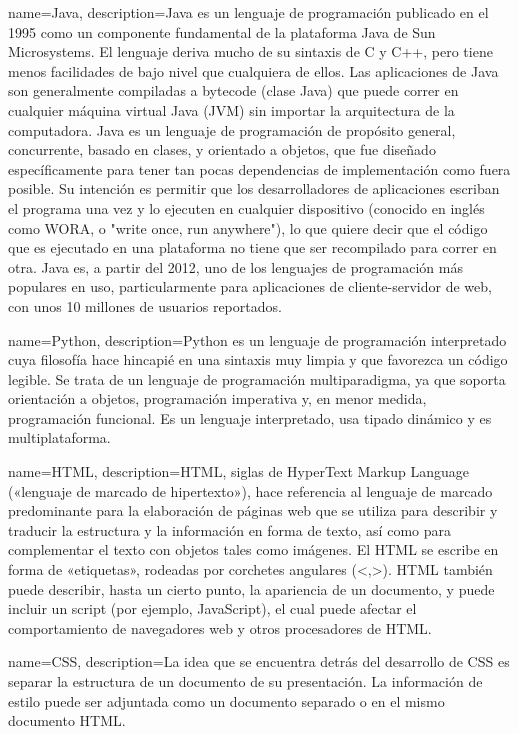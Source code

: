 {name=Java,
 description={Java es un lenguaje de programación publicado en el 1995 como un componente fundamental de la plataforma Java de Sun Microsystems. El lenguaje deriva mucho de su sintaxis de C y C++, pero tiene menos facilidades de bajo nivel que cualquiera de ellos. Las aplicaciones de Java son generalmente compiladas a bytecode (clase Java) que puede correr en cualquier máquina virtual Java (JVM) sin importar la arquitectura de la computadora. Java es un lenguaje de programación de propósito general, concurrente, basado en clases, y orientado a objetos, que fue diseñado específicamente para tener tan pocas dependencias de implementación como fuera posible. Su intención es permitir que los desarrolladores de aplicaciones escriban el programa una vez y lo ejecuten en cualquier dispositivo (conocido en inglés como WORA, o "write once, run anywhere"), lo que quiere decir que el código que es ejecutado en una plataforma no tiene que ser recompilado para correr en otra. Java es, a partir del 2012, uno de los lenguajes de programación más populares en uso, particularmente para aplicaciones de cliente-servidor de web, con unos 10 millones de usuarios reportados.}
 }
 
{name=Python,
 description={Python es un lenguaje de programación interpretado cuya filosofía hace hincapié en una sintaxis muy limpia y que favorezca un código legible. Se trata de un lenguaje de programación multiparadigma, ya que soporta orientación a objetos, programación imperativa y, en menor medida, programación funcional. Es un lenguaje interpretado, usa tipado dinámico y es multiplataforma.}
 }
 
{name=HTML,
 description={HTML, siglas de HyperText Markup Language («lenguaje de marcado de hipertexto»), hace referencia al lenguaje de marcado predominante para la elaboración de páginas web que se utiliza para describir y traducir la estructura y la información en forma de texto, así como para complementar el texto con objetos tales como imágenes. El HTML se escribe en forma de «etiquetas», rodeadas por corchetes angulares (<,>). HTML también puede describir, hasta un cierto punto, la apariencia de un documento, y puede incluir un script (por ejemplo, JavaScript), el cual puede afectar el comportamiento de navegadores web y otros procesadores de HTML.}
 }
 
{name=CSS,
 description={La idea que se encuentra detrás del desarrollo de CSS es separar la estructura de un documento de su presentación. La información de estilo puede ser adjuntada como un documento separado o en el mismo documento HTML.}
 }
 
